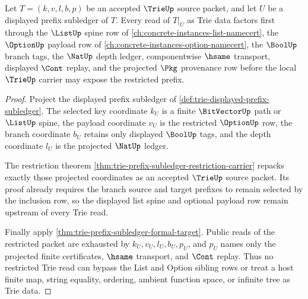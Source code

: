 \begin{theorem}\label{thm:trie-list-prefix-sibling-route}
Let $T=(k,v,l,b,p)$ be an accepted $\TrieUp$ source packet, and let $U$ be a displayed prefix subledger of $T$. Every read of $T|_U$ as Trie data factors first through the $\ListUp$ spine row of \autoref{ch:concrete-instances-list-namecert}, the $\OptionUp$ payload row of \autoref{ch:concrete-instances-option-namecert}, the $\BoolUp$ branch tags, the $\NatUp$ depth ledger, componentwise $\hsame$ transport, displayed $\Cont$ replay, and the projected $\Pkg$ provenance row before the local $\TrieUp$ carrier may expose the restricted prefix.
\end{theorem}
\begin{proof}
Project the displayed prefix subledger of \autoref{def:trie-displayed-prefix-subledger}. The selected key coordinate $k_U$ is a finite $\BitVectorUp$ path or $\ListUp$ spine, the payload coordinate $v_U$ is the restricted $\OptionUp$ row, the branch coordinate $b_U$ retains only displayed $\BoolUp$ tags, and the depth coordinate $l_U$ is the projected $\NatUp$ ledger.

The restriction theorem \autoref{thm:trie-prefix-subledger-restriction-carrier} repacks exactly those projected coordinates as an accepted $\TrieUp$ source packet. Its proof already requires the branch source and target prefixes to remain selected by the inclusion row, so the displayed list spine and optional payload row remain upstream of every Trie read.

Finally apply \autoref{thm:trie-prefix-subledger-formal-target}. Public reads of the restricted packet are exhausted by $k_U,v_U,l_U,b_U,p_U$, and $p_U$ names only the projected finite certificates, $\hsame$ transport, and $\Cont$ replay. Thus no restricted Trie read can bypass the List and Option sibling rows or treat a host finite map, string equality, ordering, ambient function space, or infinite tree as Trie data.
\end{proof}
